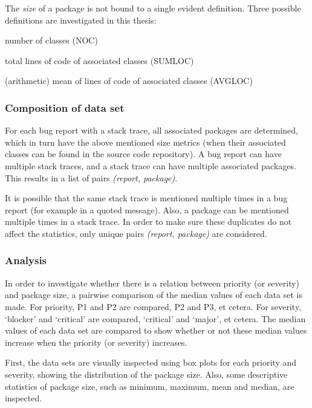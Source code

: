\vspace{\baselineskip}
\hypac{}

\vspace{\baselineskip}
\hypad{}

\vspace{\baselineskip}

The \emph{size} of a package is not bound to a single evident definition. Three possible definitions are investigated in this thesis:

\begin{enumerate*}
	\item number of classes (NOC)
	\item total lines of code of associated classes (SUMLOC)
	\item (arithmetic) mean of lines of code of associated classes (AVGLOC)
\end{enumerate*}

\subsubsection{Composition of data set}
For each bug report with a stack trace, all associated packages are determined, which in turn have the above mentioned size metrics (when their associated classes can be found in the source code repository). A bug report can have multiple stack traces, and a stack trace can have multiple associated packages. This results in a list of pairs \emph{(report, package)}. 

It is possible that the same stack trace is mentioned multiple times in a bug report (for example in a quoted message). Also, a package can be mentioned multiple times in a stack trace. In order to make sure these duplicates do not affect the statistics, only unique pairs \emph{(report, package)} are considered.

\subsubsection{Analysis}
In order to investigate whether there is a relation between priority (or severity) and package size, a pairwise comparison of the median values of each data set is made. For priority, P1 and P2 are compared, P2 and P3, et cetera. For severity, `blocker' and `critical' are compared, `critical' and `major', et cetera. The median values of each data set are compared to show whether or not these median values increase when the priority (or severity) increases. 

First, the data sets are visually inspected using box plots for each priority and severity, showing the distribution of the package size. Also, some descriptive statistics of package size, such as minimum, maximum, mean and median, are inspected.

